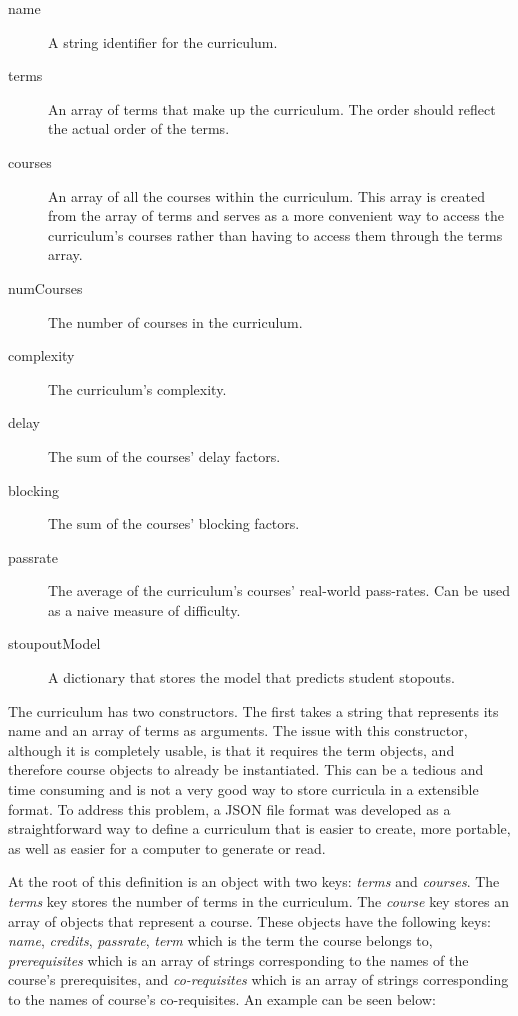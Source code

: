 \documentclass[botnum, fleqn]{unmeethesis}
\begin{document}
    \begin{description}
      \item [name] A string identifier for the curriculum.
      \item [terms] An array of terms that make up the curriculum. The order should reflect the actual order of the terms.
      \item [courses] An array of all the courses within the curriculum. This array is created from the array of terms and serves as a more convenient way to access the curriculum's courses rather than having to access them through the terms array.
      \item [numCourses] The number of courses in the curriculum.
      \item [complexity] The curriculum's complexity.
      \item [delay] The sum of the courses' delay factors.
      \item [blocking] The sum of the courses' blocking factors.
      \item [passrate] The average of the curriculum's courses' real-world pass-rates. Can be used as a naive measure of difficulty.
      \item [stoupoutModel] A dictionary that stores the model that predicts student stopouts.
    \end{description}

    The curriculum has two constructors. The first takes a string that represents its name and an array of terms as arguments. The issue with this constructor, although it is completely usable, is that it requires the term objects, and therefore course objects to already be instantiated. This can be a tedious and time consuming and is not a very good way to store curricula in a extensible format. To address this problem, a JSON file format was developed as a straightforward way to define a curriculum that is easier to create, more portable, as well as easier for a computer to generate or read.

    At the root of this definition is an object with two keys: \textit{terms} and \textit{courses}. The \textit{terms} key stores the number of terms in the curriculum. The \textit{course} key stores an array of objects that represent a course. These objects have the following keys: \textit{name}, \textit{credits}, \textit{passrate}, \textit{term} which is the term the course belongs to, \textit{prerequisites} which is an array of strings corresponding to the names of the course's prerequisites, and \textit{co-requisites} which is an array of strings corresponding to the names of course's co-requisites. An example can be seen below:
\end{document}
